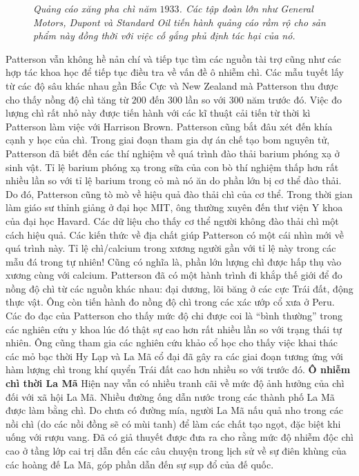 \begin{multicols}{2}
\begin{figure}[H]
		\caption{\small\textit{\color{timhieukhoahoc}Quảng cáo xăng pha chì năm $1933$. Các tập đoàn lớn như General Motors, Dupont và Standard Oil tiến hành quảng cáo rầm rộ cho sản phẩm này đồng thời với việc cố gắng phủ định tác hại của nó.}}
		\vspace*{-10pt}
	\end{figure}
	Patterson vẫn không hề nản chí và tiếp tục tìm các nguồn tài trợ cũng như các hợp tác khoa học để tiếp tục điều tra về vấn đề ô nhiễm chì. Các mẫu tuyết lấy từ các độ sâu khác nhau gần Bắc Cực và New Zealand mà Patterson thu được cho thấy nồng độ chì tăng từ $200$ đến $300$ lần so với $300$ năm trước đó. Việc đo lượng chì rất nhỏ này được tiến hành với các kĩ thuật cải tiến từ thời kì Patterson làm việc với Harrison Brown. Patterson cũng bắt đâu xét đến khía cạnh y học của chì. Trong giai đoạn tham gia dự án chế tạo bom nguyên tử, Patterson đã biết đến các thí nghiệm về quá trình đào thải barium phóng xạ ở sinh vật. Tỉ lệ barium phóng xạ trong sữa của con bò thí nghiệm thấp hơn rất nhiều lần so với tỉ lệ barium trong cỏ mà nó ăn do phần lớn bị cơ thể đào thải. Do đó, Patterson cũng tò mò về hiệu quả đào thải chì của cơ thể. Trong thời gian làm giáo sư thỉnh giảng ở đại học MIT, ông thường xuyên đến thư viện Y khoa của đại học Havard. Các dữ liệu cho thấy cơ thể người không đào thải chì một cách hiệu quả. Các kiến thức về địa chất giúp Patterson có một cái nhìn mới về quá trình này. Tỉ lệ chì/calcium trong xương người gần với tỉ lệ này trong các mẫu đá trong tự nhiên! Cũng có nghĩa là, phần lớn lượng chì được hấp thụ vào xương cùng với calcium.
	\vskip 0.1cm
	Patterson đã có một hành trình đi khắp thế giới để đo nồng độ chì từ các nguồn khác nhau: đại dương, lõi băng ở các cực Trái đất, động thực vật. Ông còn tiến hành đo nồng độ chì trong các xác ướp cổ xưa ở Peru. Các đo đạc của Patterson cho thấy mức độ chi được coi là “bình thường” trong các nghiên cứu y khoa lúc đó thật sự cao hơn rất nhiều lần so với trạng thái tự nhiên. Ông cũng tham gia các nghiên cứu khảo cổ học cho thấy việc khai thác các mỏ bạc thời Hy Lạp và La Mã cổ đại đã gây ra các giai đoạn tương ứng với hàm lượng chì trong khí quyển Trái đất cao hơn nhiều so với trước đó.
	\vskip 0.1cm
	\textbf{\color{timhieukhoahoc}Ô nhiễm chì thời La Mã}
	\vskip 0.1cm
	Hiện nay vẫn có nhiều tranh cãi về mức độ ảnh hưởng của chì đối với xã hội La Mã. Nhiều đường ống dẫn nước trong các thành phố La Mã được làm bằng chì. Do chưa có đường mía, người La Mã nấu quả nho trong các nồi chì (do các nồi đồng sẽ có mùi tanh) để làm các chất tạo ngọt, đặc biệt khi uống với rượu vang. Đã có giả thuyết được đưa ra cho rằng mức độ nhiễm độc chì cao ở tầng lớp cai trị dẫn đến các câu chuyện trong lịch sử về sự điên khùng của các hoàng đế La Mã, góp phần dẫn đến sự sụp đổ của đế quốc. 

\end{multicols}
